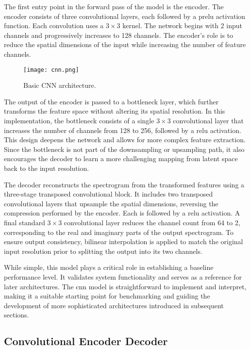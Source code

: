 The first entry point in the forward pass of the model is the encoder. The encoder consists of three convolutional layers, each followed by a \gls{prelu} activation function. Each convolution uses a \(3 \times 3\) kernel. The network begins with 2 input channels and progressively increases to 128 channels. The encoder's role is to reduce the spatial dimensions of the input while increasing the number of feature channels.

\begin{figure}[h]
    \centering
    \texttt{[image: cnn.png]}
    \caption{\label{fig:cnn}Basic CNN architecture.}
\end{figure}

The output of the encoder is passed to a bottleneck layer, which further transforms the feature space without altering its spatial resolution. In this implementation, the bottleneck consists of a single \(3 \times 3\) convolutional layer that increases the number of channels from 128 to 256, followed by a \gls{relu} activation. This design deepens the network and allows for more complex feature extraction. Since the bottleneck is not part of the downsampling or upsampling path, it also encourages the decoder to learn a more challenging mapping from latent space back to the input resolution.

The decoder reconstructs the spectrogram from the transformed features using a three-stage transposed convolutional block. It includes two transposed convolutional layers that upsample the spatial dimensions, reversing the compression performed by the encoder. Each is followed by a \gls{relu} activation. A final standard \(3 \times 3\) convolutional layer reduces the channel count from 64 to 2, corresponding to the real and imaginary parts of the output spectrogram. To ensure output consistency, bilinear interpolation is applied to match the original input resolution prior to splitting the output into its two channels.

While simple, this model plays a critical role in establishing a baseline performance level. It validates system functionality and serves as a reference for later architectures. The \gls{cnn} model is straightforward to implement and interpret, making it a suitable starting point for benchmarking and guiding the development of more sophisticated architectures introduced in subsequent sections.

\subsection{Convolutional Encoder Decoder}
\label{sec:ced}

